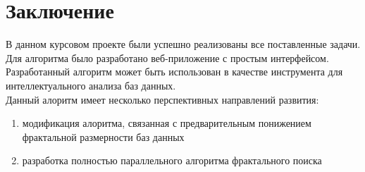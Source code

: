 \section{Заключение}

В данном курсовом проекте были успешно реализованы все поставленные задачи. Для алгоритма было разработано веб-приложение с простым интерфейсом.
Разработанный алгоритм может быть использован в качестве инструмента для интеллектуального анализа баз данных.
\\

Данный алоритм имеет несколько перспективных направлений развития:
\begin{enumerate}
\item модификация алоритма, связанная с предварительным понижением фрактальной размерности баз данных
\item разработка полностью параллельного алгоритма фрактального поиска
\end{enumerate}
